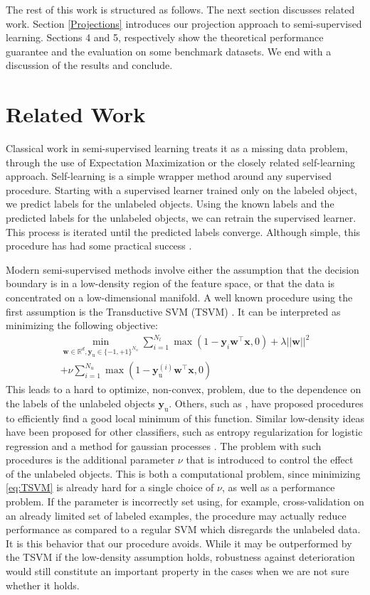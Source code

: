 \documentclass{article}
\renewcommand{\vec}[1]{\mathbf{#1}}
\begin{document}
The rest of this work is structured as follows. The next section discusses related work. Section \ref{Projections} introduces our projection approach to semi-supervised learning. Sections 4 and 5, respectively show the theoretical performance guarantee and the evaluation on some benchmark datasets. We end with a discussion of the results and conclude.

\section{Related Work}
Classical work in semi-supervised learning treats it as a missing data problem, through the use of Expectation Maximization or the closely related self-learning \cite{McLachlan1975} approach. Self-learning is a simple wrapper method around any supervised procedure. Starting with a supervised learner trained only on the labeled object, we predict labels for the unlabeled objects. Using the known labels and the predicted labels for the unlabeled objects, we can retrain the supervised learner. This process is iterated until the predicted labels converge. Although simple, this procedure has had some practical success \cite{Nigam2000}.

Modern semi-supervised methods involve either the assumption that the decision boundary is in a low-density region of the feature space, or that the data is concentrated on a low-dimensional manifold. A well known procedure using the first assumption is the Transductive SVM (TSVM) \cite{Joachims1999}. It can be interpreted as minimizing the following objective:
\begin{multline}
\label{eq:TSVM}
\min_{\vec{w} \in \mathbb{R}^d,\vec{y}_\text{u} \in \{-1,+1\}^{N_u}} \sum_{i=1}^{N_l} \max(1-\vec{y}_i \vec{w}^\top \vec{x},0) + \lambda ||\vec{w}||^2 \\ + \nu \sum_{i=1}^{N_u} \max(1-\vec{y}_\text{u}^{(i)} \vec{w}^\top \vec{x},0)
\end{multline}
This leads to a hard to optimize, non-convex, problem, due to the dependence on the labels of the unlabeled objects $\vec{y}_\text{u}$. Others, such as \cite{Sindhwani2006}, have proposed procedures to efficiently find a good local minimum of this function. Similar low-density ideas have been proposed for other classifiers, such as entropy regularization for logistic regression \cite{Grandvalet2005} and a method for gaussian processes \cite{Lawrence2004}. The problem with such procedures is the additional parameter $\nu$ that is introduced to control the effect of the unlabeled objects. This is both a computational problem, since minimizing \eqref{eq:TSVM} is already hard for a single choice of $\nu$, as well as a performance problem. If the parameter is incorrectly set using, for example, cross-validation on an already limited set of labeled examples, the procedure may actually reduce performance as compared to a regular SVM which disregards the unlabeled data. It is this behavior that our procedure avoids. While it may be outperformed by the TSVM if the low-density assumption holds, robustness against deterioration would still constitute an important property in the cases when we are not sure whether it holds.
\end{document}

